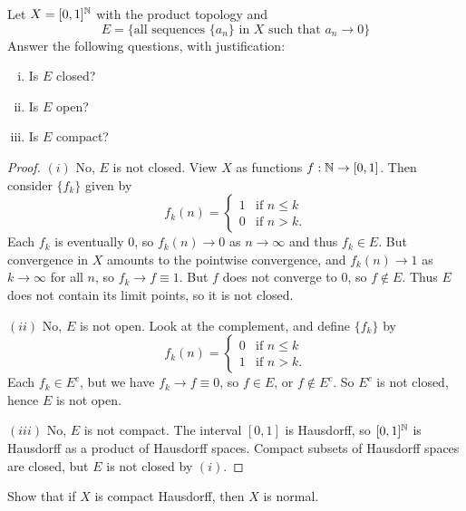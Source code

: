 \begin{exercise}
  Let $X = [0, 1]^{\mathbb{N}}$ with the product topology and
  \[
    E = \{\text{all sequences $\{a_n\}$ in $X$ such that $a_n \to 0$}\}
  \]
  Answer the following questions, with justification:
  \begin{enumerate}[(i)]
    \item Is $E$ closed?
    \item Is $E$ open?
    \item Is $E$ compact?
  \end{enumerate}
\end{exercise}

\begin{proof}
  $(i)$ No, $E$ is not closed. View $X$
  as functions $f : \mathbb{N} \to [0, 1]$. Then consider
  $\{f_k\}$ given by
  \[
    f_{k}(n) =
    \begin{cases}
      1 & \text{if $n \le k$} \\
      0 & \text{if $n > k$}.
    \end{cases}
  \]
  Each $f_k$ is eventually $0$, so $f_k(n) \to 0$
  as $n \to \infty$ and thus $f_k \in E$.
  But convergence in $X$ amounts to the
  pointwise convergence, and $f_k(n) \to 1$ as
  $k \to \infty$ for all $n$, so $f_k \to f \equiv 1$.
  But $f$ does not converge to $0$, so $f \notin E$.
  Thus $E$ does not contain its limit points,
  so it is not closed.
  
  $(ii)$ No, $E$ is not open. Look at the complement,
  and define $\{f_k\}$ by
  \[
    f_k(n) =
    \begin{cases}
      0 & \text{if $n \le k$} \\
      1 & \text{if $n > k$}.
    \end{cases}
  \]
  Each $f_k \in E^c$, but we
  have $f_k \to f \equiv 0$, so $f \in E$, or
  $f \notin E^c$. So $E^c$ is not closed, hence
  $E$ is not open.

  $(iii)$ No, $E$ is not compact. The interval
  $[0, 1]$ is Hausdorff, so $[0, 1]^{\mathbb{N}}$ is Hausdorff
  as a product of Hausdorff spaces. Compact
  subsets of Hausdorff spaces are closed, but
  $E$ is not closed by $(i)$.
\end{proof}

\begin{exercise}
  Show that if $X$ is compact Hausdorff,
  then $X$ is normal.
\end{exercise}

